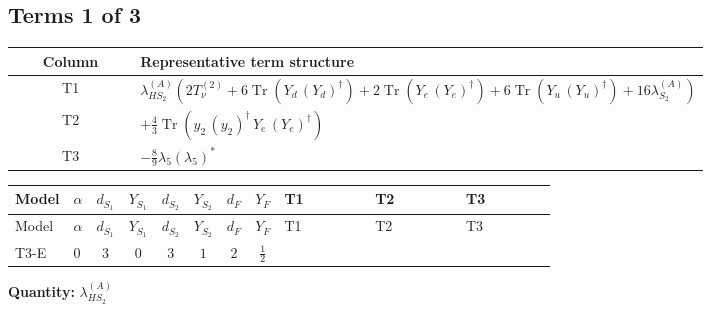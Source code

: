 \documentclass[8pt]{article}
\begin{document}
\begin{landscape}
\subsection*{Terms 1 of 3}
\begin{center}
\begin{tabular}{@{}c >{\raggedright\arraybackslash}p{0.82\linewidth}@{}}
\toprule
Column & Representative term structure \\
\midrule
T1 & \(\displaystyle {\lambda_{HS_2}^{(A)}} (2 T_{\nu}^{(2)}+6 \operatorname{Tr}\!\left({Y_d}\,\left({Y_d}\right)^{\dagger}\right)+2 \operatorname{Tr}\!\left({Y_e}\,\left({Y_e}\right)^{\dagger}\right)+6 \operatorname{Tr}\!\left({Y_u}\,\left({Y_u}\right)^{\dagger}\right)+16 {\lambda_{S_2}^{(A)}})\) \\
\midrule
T2 & \(\displaystyle +\frac{4}{3} \operatorname{Tr}\!\left({y_2}\,\left({y_2}\right)^{\dagger}\,{Y_e}\,\left({Y_e}\right)^{\dagger}\right)\) \\
\midrule
T3 & \(\displaystyle -\frac{8}{9} {\lambda_5} \left({\lambda_5}\right)^{*}\) \\
\midrule
\bottomrule
\end{tabular}
\end{center}
\smallskip
\tiny
\begin{longtable}{@{}llcccccc >{\raggedright\arraybackslash}p{0.21\linewidth} >{\raggedright\arraybackslash}p{0.21\linewidth} >{\raggedright\arraybackslash}p{0.21\linewidth}@{}}
\toprule
Model & $\alpha$ & $d_{S_1}$ & $Y_{S_1}$ & $d_{S_2}$ & $Y_{S_2}$ & $d_F$ & $Y_F$ & T1 & T2 & T3 \\
\midrule
\endfirsthead
\toprule
Model & $\alpha$ & $d_{S_1}$ & $Y_{S_1}$ & $d_{S_2}$ & $Y_{S_2}$ & $d_F$ & $Y_F$ & T1 & T2 & T3 \\
\midrule
\endhead
T3-E & $0$ & $3$ & $0$ & $3$ & $1$ & $2$ & $\frac{1}{2}$ & \scriptsize\adjustbox{max width=\linewidth}{$\begin{gathered} {\lambda_{HS_2}^{(A)}} (2 T_{\nu}^{(2)}+6 \operatorname{Tr}\!\left({Y_d}\,\left({Y_d}\right)^{\dagger}\right)+2 \operatorname{Tr}\!\left({Y_e}\,\left({Y_e}\right)^{\dagger}\right)+6 \operatorname{Tr}\!\left({Y_u}\,\left({Y_u}\right)^{\dagger}\right)+16 {\lambda_{S_2}^{(A)}})\end{gathered}$} & \scriptsize\adjustbox{max width=\linewidth}{$\begin{gathered} +\frac{4}{3} \operatorname{Tr}\!\left({y_2}\,\left({y_2}\right)^{\dagger}\,{Y_e}\,\left({Y_e}\right)^{\dagger}\right)\end{gathered}$} & \scriptsize\adjustbox{max width=\linewidth}{$\begin{gathered} -\frac{8}{9} {\lambda_5} \left({\lambda_5}\right)^{*}\end{gathered}$} \\
\midrule
\bottomrule
\end{longtable}
\clearpage
\noindent\textbf{Quantity: }$\lambda_{HS_2}^{(A)}$\par\smallskip

\end{landscape}
\end{document}
